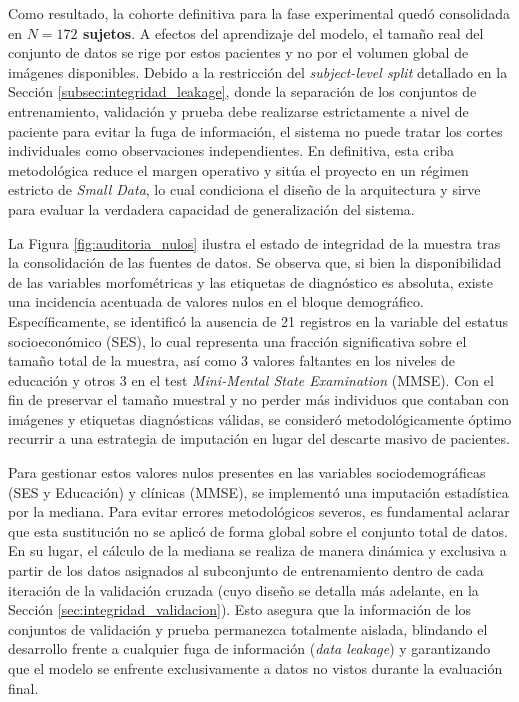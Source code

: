 \documentclass[12pt, oneside, english, spanish]{book}
\begin{document}
Como resultado, la cohorte definitiva para la fase experimental quedó consolidada en \textbf{$N = 172$ sujetos}. A efectos del aprendizaje del modelo, el tamaño real del conjunto de datos se rige por estos pacientes y no por el volumen global de imágenes disponibles. Debido a la restricción del \textit{subject-level split} detallado en la Sección \ref{subsec:integridad_leakage}, donde la separación de los conjuntos de entrenamiento, validación y prueba debe realizarse estrictamente a nivel de paciente para evitar la fuga de información, el sistema no puede tratar los cortes individuales como observaciones independientes. En definitiva, esta criba metodológica reduce el margen operativo y sitúa el proyecto en un régimen estricto de \textit{Small Data}, lo cual condiciona el diseño de la arquitectura y sirve para evaluar la verdadera capacidad de generalización del sistema.

La Figura \ref{fig:auditoria_nulos} ilustra el estado de integridad de la muestra tras la consolidación de las fuentes de datos. Se observa que, si bien la disponibilidad de las variables morfométricas y las etiquetas de diagnóstico es absoluta, existe una incidencia acentuada de valores nulos en el bloque demográfico. Específicamente, se identificó la ausencia de 21 registros en la variable del estatus socioeconómico (SES), lo cual representa una fracción significativa sobre el tamaño total de la muestra, así como 3 valores faltantes en los niveles de educación y otros 3 en el test \textit{Mini-Mental State Examination} (MMSE). Con el fin de preservar el tamaño muestral y no perder más individuos que contaban con imágenes y etiquetas diagnósticas válidas, se consideró metodológicamente óptimo recurrir a una estrategia de imputación en lugar del descarte masivo de pacientes.

Para gestionar estos valores nulos presentes en las variables sociodemográficas (SES y Educación) y clínicas (MMSE), se implementó una imputación estadística por la mediana. Para evitar errores metodológicos severos, es fundamental aclarar que esta sustitución no se aplicó de forma global sobre el conjunto total de datos. En su lugar, el cálculo de la mediana se realiza de manera dinámica y exclusiva a partir de los datos asignados al subconjunto de entrenamiento dentro de cada iteración de la validación cruzada (cuyo diseño se detalla más adelante, en la Sección \ref{sec:integridad_validacion}). Esto asegura que la información de los conjuntos de validación y prueba permanezca totalmente aislada, blindando el desarrollo frente a cualquier fuga de información (\textit{data leakage}) y garantizando que el modelo se enfrente exclusivamente a datos no vistos durante la evaluación final.
\end{document}
